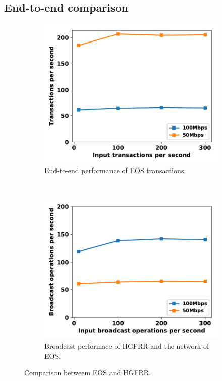 \subsection{End-to-end comparison}

\begin{figure}[ht]
  \centering
    \begin{subfigure}[b]{0.23\textwidth}
    \includegraphics[width=\textwidth]{figures/eos_hgfr_e2e_tps_on_input.pdf}
    \caption{End-to-end performance of EOS transactions.}
    \label{eos_hgfr_e2e_tps_on_input}
    \end{subfigure}
    ~
    \begin{subfigure}[b]{0.23\textwidth}
	  \includegraphics[width=\textwidth]{figures/eos_hgfr_micro_tps_on_input.pdf}
	  \caption{Broadcast performace of HGFRR and the network of EOS.}
    \label{eos_hgfr_micro_tps_on_input}
    \end{subfigure}

	\caption{Comparison betweem EOS and HGFRR.}
	\label{fig_eos_hgfr}
	\vspace{-0.5cm}
\end{figure}
  

